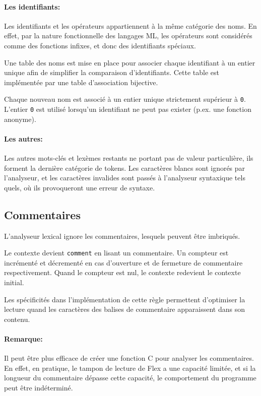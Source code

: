 \documentclass[paper=a4, fontsize=11pt]{scrartcl}
\numberwithin{equation}{section}		%
\numberwithin{figure}{section}			%
\numberwithin{table}{section}				%
\begin{document}
\paragraph{Les identifiants:}
Les identifiants et les opérateurs appartiennent à la même catégorie des noms.
En effet, par la nature fonctionnelle des langages ML, les opérateurs sont considérés comme des fonctions infixes, et donc des identifiants spéciaux.

Une table des noms est mise en place pour associer chaque identifiant à un entier unique afin de simplifier la comparaison d'identifiants. Cette table est implémentée par une table d'association bijective.

Chaque nouveau nom est associé à un entier unique strictement supérieur à \texttt{0}. L'entier \texttt{0} est utilisé lorsqu'un identifiant ne peut pas exister (p.ex. une fonction anonyme).

\paragraph{Les autres:}
Les autres mots-clés et lexèmes restants ne portant pas de valeur particulière, ils forment la dernière catégorie de tokens.
Les caractères blancs sont ignorés par l'analyseur, et les caractères invalides sont passés à l'analyseur syntaxique tels quels, où ils provoqueront une erreur de syntaxe.

\subsection{Commentaires}
L'analyseur lexical ignore les commentaires, lesquels peuvent être imbriqués.

Le contexte devient \texttt{comment} en lisant un commentaire.
Un compteur est incrémenté et décrementé en cas d'ouverture et de fermeture de commentaire respectivement.
Quand le compteur est nul, le contexte redevient le contexte initial.

Les spécificités dans l'implémentation de cette règle permettent d'optimiser la lecture quand les caractères des balises de commentaire apparaissent dans son contenu.

\begin{small}
\paragraph{Remarque:}
Il peut être plus efficace de créer une fonction C pour analyser les commentaires.
En effet, en pratique, le tampon de lecture de Flex a une capacité limitée, et si la longueur du commentaire dépasse cette capacité, le comportement du programme peut être indéterminé.
\end{small}
\end{document}
